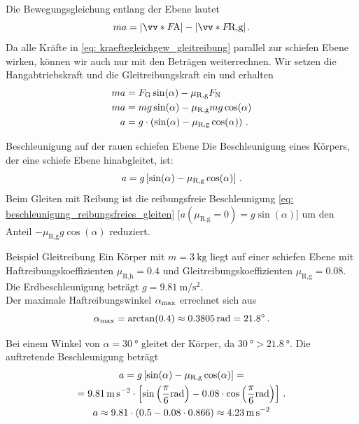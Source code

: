 Die Bewegungsgleichung entlang der Ebene lautet
\begin{equation}\label{eq: kraeftegleichgew_gleitreibung}
    m a = |\ivecS{F}{\text{A}}| - |\ivecS{F}{\text{R,g}}| \mDot
\end{equation}
Da alle Kräfte in \cref{eq: kraeftegleichgew_gleitreibung} parallel zur schiefen Ebene wirken, können wir auch nur mit den Beträgen weiterrechnen. Wir setzen die Hangabtriebskraft und die Gleitreibungskraft ein und erhalten 
\begin{equation}\begin{aligned}
    m a &= F_\text{G} \sin(\alpha) - \mu_{\text{R,g}} F_\text{N}  \\
    m a &= mg \sin(\alpha) - \mu_{\text{R,g}} mg \cos(\alpha) \\
    a &= g \cdot \left( \sin(\alpha) - \mu_{\text{R,g}} \cos(\alpha)\right) \,.
\end{aligned}\end{equation}
\begin{importantbox}[]{Beschleunigung auf der rauen schiefen Ebene}
Die Beschleunigung eines Körpers, der eine schiefe Ebene hinabgleitet, ist:
\begin{equation}\label{eq: beschleunigung_gleiten_mit_reibung}
    a = g \left[\sin(\alpha) - \mu_{\text{R,g}} \cos(\alpha)\right]\,.
\end{equation}
Beim Gleiten mit Reibung ist die reibungsfreie Beschleunigung \cref{eq: beschleunigung_reibungsfreies_gleiten} [$a(\mu_{\text{R,g}}=0) = g \sin(\alpha)$] um den Anteil $-\mu_{\text{R,g}} g \cos(\alpha)$ reduziert. 
\end{importantbox}

\begin{examplebox}{Beispiel Gleitreibung}
Ein Körper mit $m = \SI{3}{\kilo\gram}$ liegt auf einer schiefen Ebene mit Haftreibungskoeffizienten $\mu_{\text{R,h}} = 0.4$ und Gleitreibungskoeffizienten $\mu_{\text{R,g}} = 0.08$. Die Erdbeschleunigung beträgt $g=\SI{9.81}{\metre\per\second\squared}$. \\

Der maximale Haftreibungswinkel $\alpha_{\mathrm{max}}$ errechnet sich aus 
\begin{equation}
   \alpha_{\mathrm{max}} = \arctan(0.4) \approx \SI{0.3805}{\radian} = \SI{21.8}{\degree}\,.
\end{equation}

Bei einem Winkel von $\alpha = \SI{30}{\degree}$ gleitet der Körper, da $\SI{30}{\degree} > \SI{21.8}{\degree}$. Die auftretende Beschleunigung beträgt 
\begin{equation}\begin{gathered}
    a = g\left[ \sin(\alpha) - \mu_{\text{R,g}} \cos(\alpha)\right] = \\
    = \SI{9.81}{\metre\per\second\squared} \cdot \left[\sin\left(\frac{\pi}{6}\si{\radian}\right) - 0.08 \cdot \cos\left(\frac{\pi}{6}\si{\radian}\right)\right] \,.\\
    a \approx \num{9.81} \cdot (\num{0.5} - \num{0.08} \cdot \num{0.866}) \approx \SI{4.23}{\metre\per\second\squared}
\end{gathered}\end{equation}
\end{examplebox}


